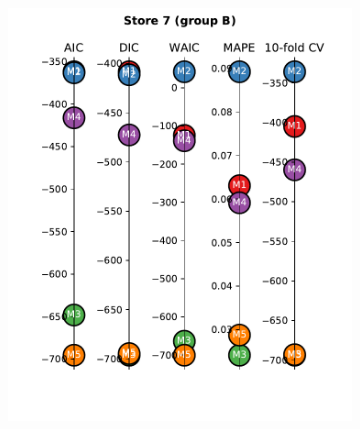 \documentclass[english, 12pt, a4paper, sci, utf8, a-1b, online]{aaltothesis}
\begin{document}
\begin{abstractpage}[english]
\begin{figure}[hbt]
	\begin{subfigure}[htb]{0.3\textwidth}
		\centering
		\includegraphics[width=\textwidth]{../plots/metrics/metrics_plot_single_store_7_of_B.pdf}
	\end{subfigure}
	\hfill
	\begin{subfigure}[htb]{0.33\textwidth}
		\centering

\end{subfigure}
\end{figure}
\end{abstractpage}
\end{document}
